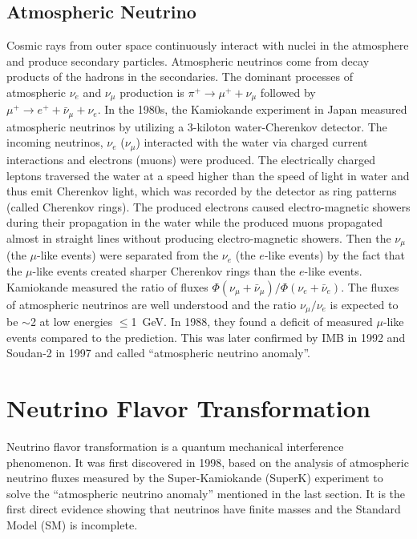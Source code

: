 \subsection{Atmospheric Neutrino}
Cosmic rays from outer space continuously interact with nuclei in the atmosphere and produce secondary particles. Atmospheric neutrinos come from decay products of the hadrons in the secondaries. The dominant processes of atmospheric $\nu_e$ and $\nu_\mu$ production is $\pi^+\to\mu^+ + \nu_\mu$ followed by $\mu^+ \to e^+ + \bar{\nu}_\mu + \nu_e$. In the 1980s, the Kamiokande experiment in Japan measured atmospheric neutrinos by utilizing a 3-kiloton water-Cherenkov detector. The incoming neutrinos, $\nu_e$ ($\nu_\mu$) interacted with the water via charged current interactions and electrons (muons) were produced. The electrically charged leptons traversed the water at a speed higher than the speed of light in water and thus emit Cherenkov light, which was recorded by the detector as ring patterns (called Cherenkov rings). The produced electrons caused electro-magnetic showers during their propagation in the water while the produced muons propagated almost in straight lines without producing electro-magnetic showers. Then the $\nu_\mu$ (the $\mu$-like events) were separated from the $\nu_e$ (the $e$-like events) by the fact that the $\mu$-like events created sharper Cherenkov rings than the $e$-like events. Kamiokande measured the ratio of fluxes $\Phi(\nu_\mu+\bar{\nu}_\mu)/\Phi(\nu_e+\bar{\nu}_e)$. The fluxes of atmospheric neutrinos are well understood and the ratio $\nu_\mu/\nu_e$ is expected to be $\sim$2 at low energies $\leq$1~GeV. In 1988, they found a deficit of measured $\mu$-like events compared to the prediction. This was later confirmed by IMB in 1992\cite{becker1992electron} and Soudan-2 in 1997\cite{allison1997measurement} and called ``atmospheric neutrino anomaly''\cite{kajita2012atmospheric}.

\section{Neutrino Flavor Transformation}
Neutrino flavor transformation is a quantum mechanical interference phenomenon\cite{akhmedov2019quantum}. It was first discovered in 1998, based on the analysis of atmospheric neutrino fluxes measured by the Super-Kamiokande (SuperK) experiment to solve the ``atmospheric neutrino anomaly'' mentioned in the last section\cite{fukuda1998evidence}. It is the first direct evidence showing that neutrinos have finite masses and the Standard Model (SM) is incomplete.


